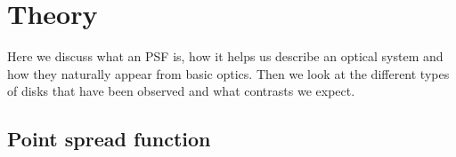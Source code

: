 
\makeatletter
\def\user@resume{resume}
\def\user@intermezzo{intermezzo}
%
\setcounter{savedparentequation}{1}
% 
\renewenvironment{subequations}[1][]{%
      \def\user@decides{#1}%
      \setcounter{previousequation}{\value{equation}}%
      \ifx\user@decides\user@resume 
           \setcounter{equation}{\value{savedparentequation}}%
      \else  
      \ifx\user@decides\user@intermezzo
           \refstepcounter{equation}%
      \else
           \setcounter{lastsubequation}{0}%
           \refstepcounter{equation}%
      \fi\fi
      \protected@edef\theHparentequation{%
          \@ifundefined {theHequation}\theequation \theHequation}%
      \protected@edef\theparentequation{\theequation}%
      \setcounter{parentequation}{\value{equation}}%
      \ifx\user@decides\user@resume 
           \setcounter{equation}{\value{lastsubequation}}%
         \else
           \setcounter{equation}{0}%
      \fi
      \def\theequation  {\theparentequation  \alph{equation}}%
      \def\theHequation {\theHparentequation \alph{equation}}%
      \ignorespaces
}{%
  \ifx\user@decides\user@resume
       \setcounter{lastsubequation}{\value{equation}}%
       \setcounter{equation}{\value{previousequation}}%
  \else
  \ifx\user@decides\user@intermezzo
       \setcounter{equation}{\value{parentequation}}%
  \else
       \setcounter{lastsubequation}{\value{equation}}%
       \setcounter{savedparentequation}{\value{parentequation}}%
       \setcounter{equation}{\value{parentequation}}%
  \fi\fi
  \ignorespacesafterend
}
\makeatother

\chapter{Theory} %
\label{ch:theory} %
Here we discuss what an \ac{PSF} is, how it helps us describe an optical system and how they naturally appear from basic optics. Then we look at the different types of disks that have been observed and what contrasts we expect.
\section{Point spread function}
\label{sec:PSF}

